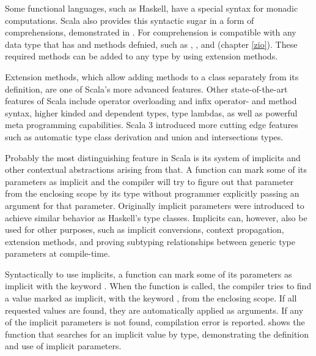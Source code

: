 

Some functional languages, such as Haskell, have a special syntax for monadic computations. Scala also provides this syntactic sugar in a form of  comprehensions, demonstrated in . For comprehension is compatible with any data type that has  and  methods defnied, such as , , and  (chapter \ref{zio}). These required methods can be added to any type by using extension methods.

Extension methods, which allow adding methods to a class separately from its definition, are one of Scala's more advanced features. Other state-of-the-art features of Scala include operator overloading and infix operator- and method syntax, higher kinded and dependent types, type lambdas, as well as powerful meta programming capabilities. Scala 3 introduced more cutting edge features such as automatic type class derivation and union and intersections types.

Probably the most distinguishing feature in Scala is its system of implicits and other contextual abstractions arising from that. A function can mark some of its parameters as implicit and the compiler will try to figure out that parameter from the enclosing scope by its type without programmer explicitly passing an argument for that parameter. Originally implicit parameters were introduced to achieve similar behavior as Haskell's type classes. Implicits can, however, also be used for other purposes, such as implicit conversions, context propagation, extension methods, and proving subtyping relationships between generic type parameters at compile-time.~\cite{tc-as-objects}

Syntactically to use implicits, a function can mark some of its parameters as implicit with the keyword . When the function is called, the compiler tries to find a value marked as implicit, with the keyword , from the enclosing scope. If all requested values are found, they are automatically applied as arguments. If any of the implicit parameters is not found, compilation error is reported.  shows the function  that searches for an implicit value by type, demonstrating the definition and use of implicit parameters.



